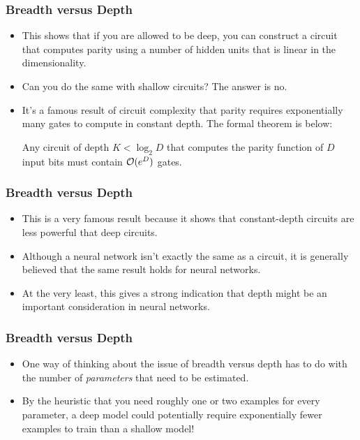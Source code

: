 \documentclass[trans]{beamer}
\begin{document}
\begin{frame}
  \frametitle{Breadth versus Depth}
\begin{itemize}
\item
This shows that if you are allowed to be deep, you can construct a
circuit  that computes parity using a number of hidden units that
is linear in the dimensionality.
\item   Can you do the same with shallow
circuits?  The answer is no. 
\item  It's a famous result of circuit
complexity that parity requires exponentially many gates to compute in
constant depth.  The formal theorem is below:
\begin{theorem} \label{thm:nnet:parity}
  Any circuit of depth $K < \log_2 D$ that computes the parity
  function of $D$ input bits must contain $\mathcal{O}(e^D)$ gates.
\end{theorem}
\end{itemize}
\end{frame}

\begin{frame}
  \frametitle{Breadth versus Depth}
\begin{itemize}
\item
This is a very famous result because it shows that constant-depth
circuits are less powerful that deep circuits.  
\item Although a neural
network isn't exactly the same as a circuit, it is generally believed
that the same result holds for neural networks.
\item  At the very least,
this gives a strong indication that depth might be an important
consideration in neural networks.
\end{itemize}
\end{frame}


\begin{frame}
  \frametitle{Breadth versus Depth}
\begin{itemize}
\item
One way of thinking about the issue of breadth versus depth has to do
with the number of \emph{parameters} that need to be estimated.  
\item By
the heuristic that you need roughly one or two examples for every
parameter, a deep model could potentially require exponentially fewer
examples to train than a shallow model!
\end{itemize}
\end{frame}
\end{document}
